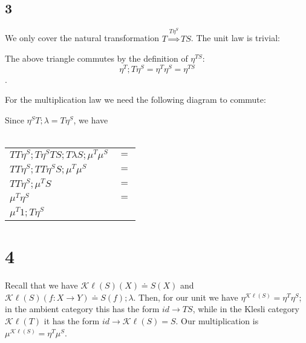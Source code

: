 \documentclass{article}
\begin{document}
\subsection*{3}

We only cover the natural transformation $T \overset{T \eta^S}{\Longrightarrow} TS$. The unit law is trivial:

\begin{center}
\end{center}

The above triangle commutes by the definition of $\eta^{TS}$: $$\eta^T;T\eta^S = \eta^T \eta^S = \eta^{TS}$$.

For the multiplication law we need the following diagram to commute:

\begin{center}
\end{center}

Since $\eta^S T;\lambda = T \eta^S$, we have \\~\\
\begin{tabular}{ll}
$TT\eta^S;T \eta^S TS;T \lambda S; \mu^T \mu^S$ & $=$ \\
$TT \eta^S;TT\eta^SS;\mu^T\mu^S$ & $=$ \\
$TT \eta^S;\mu^T S$ & $=$ \\
$\mu^T \eta^S$ & $=$ \\
$\mu^T 1;T \eta^S$

\end{tabular}

\section*{4}

Recall that we have $\mathcal K \ell(S)(X) \doteq S(X)$ and $\mathcal K \ell (S)(f : X \to Y) \doteq S(f);\lambda$.
Then, for our unit we have $\eta^{\mathcal K \ell(S)} = \eta^T \eta^S$; in the ambient category this has 
the form $\mathit{id} \longrightarrow TS$, while in the Klesli category $\mathcal K \ell(T)$ it has
the form $\mathit{id} \longrightarrow \mathcal{K} \ell (S) = S$.
Our multiplication is $\mu^{\mathcal K \ell(S)} = \eta^T \mu^S$.\\~\\
\end{document}
